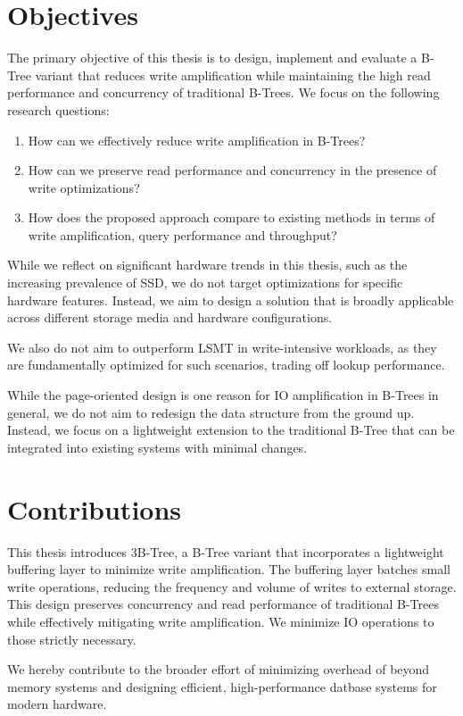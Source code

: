 
\section{Objectives}
The primary objective of this thesis is to design, implement and evaluate a B-Tree variant that reduces write amplification while maintaining the high read performance and concurrency of traditional B-Trees.
We focus on the following research questions:
\begin{enumerate}
  \item How can we effectively reduce write amplification in B-Trees?
  \item How can we preserve read performance and concurrency in the presence of write optimizations?
  \item How does the proposed approach compare to existing methods in terms of write amplification, query performance and throughput?
\end{enumerate}

While we reflect on significant hardware trends in this thesis, such as the increasing prevalence of \ac{SSD}, we do not target optimizations for specific hardware features.
Instead, we aim to design a solution that is broadly applicable across different storage media and hardware configurations.

We also do not aim to outperform \ac{LSMT} in write-intensive workloads, as they are fundamentally optimized for such scenarios, trading off lookup performance.

While the page-oriented design is one reason for \ac{IO} amplification in B-Trees in general, we do not aim to redesign the data structure from the ground up.
Instead, we focus on a lightweight extension to the traditional B-Tree that can be integrated into existing systems with minimal changes.

\section{Contributions}
This thesis introduces 3B-Tree, a B-Tree variant that incorporates a lightweight buffering layer to minimize write amplification.
The buffering layer batches small write operations, reducing the frequency and volume of writes to external storage.
This design preserves concurrency and read performance of traditional B-Trees while effectively mitigating write amplification.
We minimize \ac{IO} operations to those strictly necessary. 

We hereby contribute to the broader effort of minimizing overhead of beyond memory systems and designing efficient, high-performance datbase systems for modern hardware.
